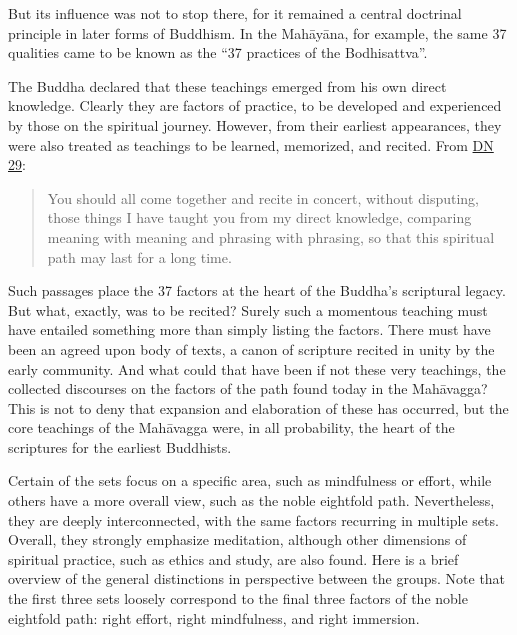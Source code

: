 \documentclass[12pt,openany]{book}%
\begin{document}
But its influence was not to stop there, for it remained a central doctrinal principle in later forms of Buddhism. In the \textsanskrit{Mahāyāna}, for example, the same 37 qualities came to be known as the “37 practices of the Bodhisattva”.

The Buddha declared that these teachings emerged from his own direct knowledge. Clearly they are factors of practice, to be developed and experienced by those on the spiritual journey. However, from their earliest appearances, they were also treated as teachings to be learned, memorized, and recited. From \href{https://suttacentral.net/dn29}{DN 29}:

\begin{quotation}%
You should all come together and recite in concert, without disputing, those things I have taught you from my direct knowledge, comparing meaning with meaning and phrasing with phrasing, so that this spiritual path may last for a long time.

%
\end{quotation}

Such passages place the 37 factors at the heart of the Buddha’s scriptural legacy. But what, exactly, was to be recited? Surely such a momentous teaching must have entailed something more than simply listing the factors. There must have been an agreed upon body of texts, a canon of scripture recited in unity by the early community. And what could that have been if not these very teachings, the collected discourses on the factors of the path found today in the \textsanskrit{Mahāvagga}? This is not to deny that expansion and elaboration of these has occurred, but the core teachings of the \textsanskrit{Mahāvagga} were, in all probability, the heart of the scriptures for the earliest Buddhists.

Certain of the sets focus on a specific area, such as mindfulness or effort, while others have a more overall view, such as the noble eightfold path. Nevertheless, they are deeply interconnected, with the same factors recurring in multiple sets. Overall, they strongly emphasize meditation, although other dimensions of spiritual practice, such as ethics and study, are also found. Here is a brief overview of the general distinctions in perspective between the groups. Note that the first three sets loosely correspond to the final three factors of the noble eightfold path: right effort, right mindfulness, and right immersion.
\end{document}
